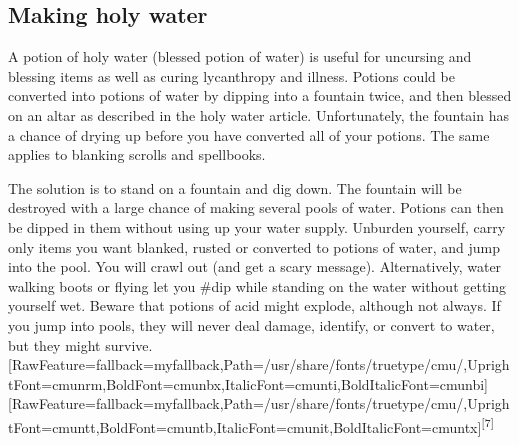 \subsection{Making holy water}
\label{14}
A potion of holy water\footnotemark[114] (blessed potion of water) is useful for uncursing and blessing items as well as curing lycanthropy and illness. Potions could be converted into potions of water by dipping into a fountain twice, and then blessed on an altar\footnotemark[115] as described in the holy water article. Unfortunately, the fountain has a chance of drying up before you have converted all of your potions. The same applies to blanking scrolls and spellbooks.


The solution is to stand on a fountain and dig down. The fountain will be destroyed with a large chance of making several pools\footnotemark[116] of water. Potions can then be dipped in them without using up your water supply. Unburden yourself, carry only items you want blanked, rusted or converted to potions of water, and jump into the pool. You will crawl out (and get a scary message).  Alternatively, water walking boots\footnotemark[117] or flying\footnotemark[118] let you \#dip\footnotemark[119] while standing on the water without getting yourself wet. Beware that potions of acid might explode, although not always. If you jump into pools, they will never deal damage, identify, or convert to water, but they might survive.\allowbreak{}\setmainfont{cmunrm.ttf}[RawFeature={fallback=myfallback},Path=/usr/share/fonts/truetype/cmu/,UprightFont=cmunrm,BoldFont=cmunbx,ItalicFont=cmunti,BoldItalicFont=cmunbi]\setmonofont{cmunrm.ttf}[RawFeature={fallback=myfallback},Path=/usr/share/fonts/truetype/cmu/,UprightFont=cmuntt,BoldFont=cmuntb,ItalicFont=cmunit,BoldItalicFont=cmuntx]\textsuperscript{{$\text{[}$}7{$\text{]}$}}



